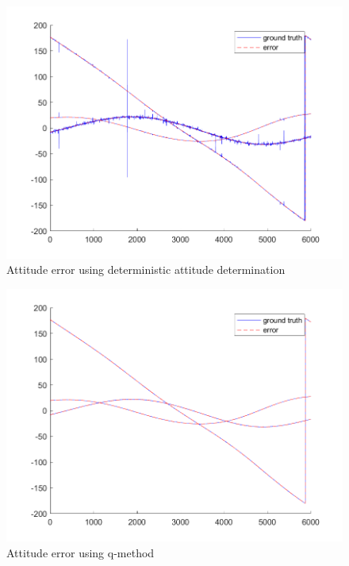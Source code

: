 \begin{figure}[H]
\centering
\includegraphics[scale=0.6]{Images/ps7_problem4_DADFict.png}
\caption{Attitude error using deterministic attitude determination}
\label{fig:ps7_problem4_DADFict}
\end{figure}

\begin{figure}[H]
\centering
\includegraphics[scale=0.6]{Images/ps7_problem4_qMethod.png}
\caption{Attitude error using q-method}
\label{fig:ps7_problem4_qMethod}
\end{figure}

